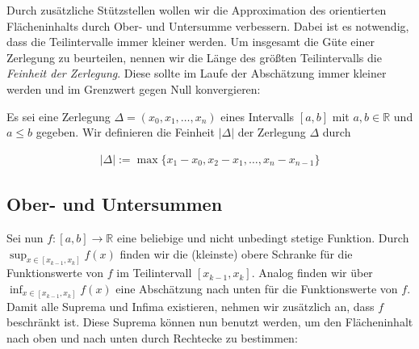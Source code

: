 \documentclass[fontsize=9pt,
               parskip=half-,
               DIV=14,
               listof=chapterentry,
               tocflat]{scrbook}
\begin{document}
Durch zusätzliche Stützstellen wollen wir die Approximation des orientierten Flächeninhalts durch Ober- und Untersumme verbessern. Dabei ist es notwendig, dass die Teilintervalle immer kleiner werden. Um insgesamt die Güte einer Zerlegung zu beurteilen, nennen wir die Länge des größten Teilintervalls die \emph{Feinheit der Zerlegung}. Diese sollte im Laufe der Abschätzung immer kleiner werden und im Grenzwert gegen Null konvergieren:

\begin{definition*}[Feinheit]
Es sei eine Zerlegung $\Delta =(x_{0},x_{1},\ldots ,x_{n})$ eines Intervalls $[a,b]$ mit $a,b\in \mathbb {R} $ und $a\leq b$ gegeben. Wir definieren die Feinheit $|\Delta |$ der Zerlegung $\Delta $ durch

\begin{align*}
|\Delta |:=\max\{x_{1}-x_{0},x_{2}-x_{1},\ldots ,x_{n}-x_{n-1}\}
\end{align*}

\end{definition*}

\subsection{Ober- und Untersummen}

Sei nun $f:[a,b]\to \mathbb {R} $ eine beliebige und nicht unbedingt stetige Funktion. Durch $\sup _{x\in [x_{k-1},x_{k}]}f(x)$ finden wir die (kleinste) obere Schranke für die Funktionswerte von $f$ im Teilintervall $[x_{k-1},x_{k}]$. Analog finden wir über $\inf _{x\in [x_{k-1},x_{k}]}f(x)$ eine Abschätzung nach unten für die Funktionswerte von $f$. Damit alle Suprema und Infima existieren, nehmen wir zusätzlich an, dass $f$ beschränkt ist. Diese Suprema können nun benutzt werden, um den Flächeninhalt nach oben und nach unten durch Rechtecke zu bestimmen:
\end{document}
